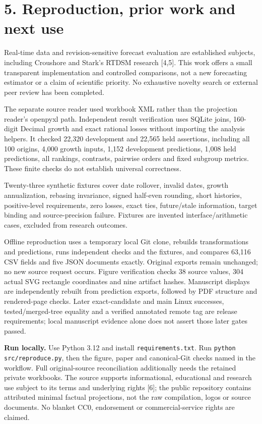 \documentclass[10pt,letterpaper]{article}
\begin{document}
\section*{5. Reproduction, prior work and next use}
Real-time data and revision-sensitive forecast evaluation are established subjects, including Croushore and Stark's RTDSM research [4,5]. This work offers a small transparent implementation and controlled comparisons, not a new forecasting estimator or a claim of scientific priority. No exhaustive novelty search or external peer review has been completed.

The separate source reader used workbook XML rather than the projection reader's openpyxl path. Independent result verification uses SQLite joins, 160-digit Decimal growth and exact rational losses without importing the analysis helpers. It checked 22,320 development and 22,565 held assertions, including all 100 origins, 4,000 growth inputs, 1,152 development predictions, 1,008 held predictions, all rankings, contrasts, pairwise orders and fixed subgroup metrics. These finite checks do not establish universal correctness.

Twenty-three synthetic fixtures cover date rollover, invalid dates, growth annualization, rebasing invariance, signed half-even rounding, short histories, positive-level requirements, zero losses, exact ties, future/stale information, target binding and source-precision failure. Fixtures are invented interface/arithmetic cases, excluded from research outcomes.

Offline reproduction uses a temporary local Git clone, rebuilds transformations and predictions, runs independent checks and the fixtures, and compares 63,116 CSV fields and five JSON documents exactly. Original exports remain unchanged; no new source request occurs. Figure verification checks 38 source values, 304 actual SVG rectangle coordinates and nine artifact hashes. Manuscript displays are independently rebuilt from prediction exports, followed by PDF structure and rendered-page checks. Later exact-candidate and main Linux successes, tested/merged-tree equality and a verified annotated remote tag are release requirements; local manuscript evidence alone does not assert those later gates passed.

\textbf{Run locally.} Use Python 3.12 and install \texttt{requirements.txt}. Run \texttt{python src/reproduce.py}, then the figure, paper and canonical-Git checks named in the workflow. Full original-source reconciliation additionally needs the retained private workbooks. The source supports informational, educational and research use subject to its terms and underlying rights [6]; the public repository contains attributed minimal factual projections, not the raw compilation, logos or source documents. No blanket CC0, endorsement or commercial-service rights are claimed.
\end{document}

